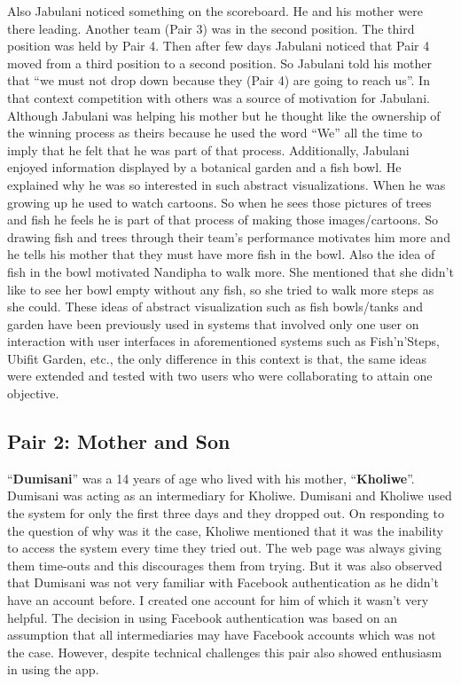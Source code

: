 Also Jabulani noticed something on the scoreboard. He and his mother were there leading. Another team (Pair 3) was in the second position. The third position was held by Pair 4. Then after few days Jabulani noticed that Pair 4 moved from a third position to a second position. So Jabulani told his mother that ``we must not drop down because they (Pair 4) are going to reach us''. In that context competition with others was a source of motivation for Jabulani. Although Jabulani was helping his mother but he thought like the ownership of the winning process as theirs because he used the word “We” all the time to imply that he felt that he was part of that process. Additionally, Jabulani enjoyed information displayed by a botanical garden and a fish bowl. He explained why he was so interested in such abstract visualizations. When he was growing up he used to watch cartoons. So when he sees those pictures of trees and fish he feels he is part of that process of making those images/cartoons. So drawing fish and trees through their team's performance motivates him more and he tells his mother that they must have more fish in the bowl. Also the idea of fish in the bowl motivated Nandipha to walk more. She mentioned  that she didn't like to see her bowl empty without any fish, so she tried to walk more steps as she could. These ideas of abstract visualization such as fish bowls/tanks and garden have been previously used in systems that involved only one user on interaction with user interfaces in aforementioned systems such as Fish'n'Steps\citep{lin2006:fish}, Ubifit Garden\citep{klasnja2009:using}, etc., the only difference in this context is that, the same ideas were extended and tested with two users who were collaborating to attain one objective.
\subsection*{\textbf{Pair 2: Mother and Son}}
``\textbf{Dumisani}'' was a 14 years of age who lived with his mother, ``\textbf{Kholiwe}''. Dumisani was acting as an intermediary for Kholiwe. Dumisani and Kholiwe used the system for only the first three days and they dropped out. On responding to the question of why was it the case, Kholiwe mentioned that it was the inability to access the system every time they tried out. The web page was always giving them time-outs and this discourages them from trying. But it was also observed that Dumisani was not very familiar with Facebook authentication as he didn't have an account before. I created one account for him of which it wasn't very helpful. The decision in using Facebook authentication was based on an assumption that all intermediaries may have Facebook accounts which was not the case. However, despite technical challenges this pair also showed enthusiasm in using the app.
